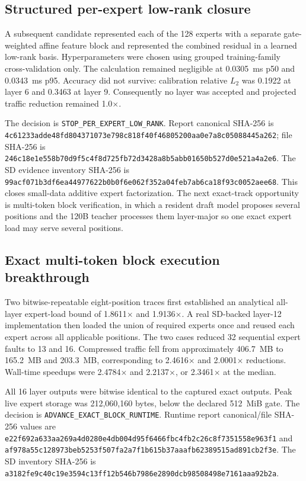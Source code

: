 \subsection{Structured per-expert low-rank closure}

A subsequent candidate represented each of the 128 experts with a separate
gate-weighted affine feature block and represented the combined residual in a
learned low-rank basis.  Hyperparameters were chosen using grouped
training-family cross-validation only.  The calculation remained negligible at
0.0305~ms p50 and 0.0343~ms p95.  Accuracy did not survive: calibration relative
$L_2$ was 0.1922 at layer 6 and 0.3463 at layer 9.  Consequently no layer was
accepted and projected traffic reduction remained 1.0$\times$.

The decision is \texttt{STOP\_PER\_EXPERT\_LOW\_RANK}.  Report canonical
SHA-256 is
\texttt{4c61233adde48fd804371073e798c818f40f46805200aa0e7a8c05088445a262};
file SHA-256 is
\texttt{246c18e1e558b70d9f5c4f8d725fb72d3428a8b5abb01650b527d0e521a4a2e6}.
The SD evidence inventory SHA-256 is
\texttt{99acf071b3df6ea44977622b0b0f6e062f352a04feb7ab6ca18f93c0052aee68}.
This closes small-data additive expert factorization.  The next exact-track
opportunity is multi-token block verification, in which a resident draft model
proposes several positions and the 120B teacher processes them layer-major so
one exact expert load may serve several positions.

\subsection{Exact multi-token block execution breakthrough}

Two bitwise-repeatable eight-position traces first established an analytical
all-layer expert-load bound of 1.8611$\times$ and 1.9136$\times$.  A real
SD-backed layer-12 implementation then loaded the union of required experts
once and reused each expert across all applicable positions.  The two cases
reduced 32 sequential expert faults to 13 and 16.  Compressed traffic fell from
approximately 406.7~MB to 165.2~MB and 203.3~MB, corresponding to
2.4616$\times$ and 2.0001$\times$ reductions.  Wall-time speedups were
2.4784$\times$ and 2.2137$\times$, or 2.3461$\times$ at the median.

All 16 layer outputs were bitwise identical to the captured exact outputs.
Peak live expert storage was 212,060,160 bytes, below the declared 512~MiB gate.
The decision is \texttt{ADVANCE\_EXACT\_BLOCK\_RUNTIME}.  Runtime report
canonical/file SHA-256 values are
\texttt{e22f692a633aa269a4d0280e4db004d95f6466fbc4fb2c26c8f7351558e963f1}
and
\texttt{af978a55c128973beb5253f507fa2a7f1b615b37aaafb62389515ad891cb2f3e}.
The SD inventory SHA-256 is
\texttt{a3182fe9c40c19e3594c13ff12b546b7986e2890dcb98508498e7161aaa92b2a}.

